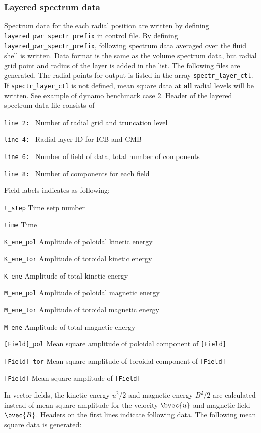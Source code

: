 \subsubsection{Layered spectrum data}
\label{section:layerd_spectr}
Spectrum data for the each radial position are written by defining {\tt layered\_pwr\_spectr\_prefix} in control file. By defining {\tt layered\_pwr\_spectr\_prefix}, following spectrum data averaged over the fluid shell is written. Data format is the same as the volume spectrum data, but radial grid point and radius of the layer is added in the list. The following files are generated. The radial points for output is listed in the array \verb|spectr_layer_ctl|. If \verb|spectr_layer_ctl| is not defined, mean square data at {\bf all} radial levels will be written. See example of \hyperref[section:dynamobench]{dynamo benchmark case 2}. Header of the layered spectrum data file consists of 
%
\begin{description}
\item{\tt  line 2: } Number of radial grid and truncation level
\item{\tt  line 4: } Radial layer ID for ICB and CMB
\item{\tt  line 6: } Number of field of data, total number of components
\item{\tt  line 8: } Number of components for each field
\end{description}
%
Field labels indicates as following:
%
\begin{description}
\item{\tt  t\_step}  Time setp number
\item{\tt  time}   Time
\item{\tt  K\_ene\_pol}  Amplitude of poloidal kinetic energy
\item{\tt  K\_ene\_tor}  Amplitude of toroidal kinetic energy
\item{\tt  K\_ene}       Amplitude of total kinetic energy
\item{\tt  M\_ene\_pol}  Amplitude of poloidal magnetic energy
\item{\tt  M\_ene\_tor}  Amplitude of toroidal magnetic energy
\item{\tt  M\_ene}       Amplitude of total magnetic energy
\item{\tt  [Field]\_pol} Mean square amplitude of poloidal component of {\tt [Field]}
\item{\tt  [Field]\_tor} Mean square amplitude of toroidal component of {\tt [Field]}
\item{\tt  [Field]}      Mean square amplitude of {\tt [Field]}
\end{description}
%
In vector fields, the kinetic energy $u^{2} / 2$ and magnetic energy $B^{2} / 2$ are calculated instead of mean square amplitude for the velocity $\bvec{u}$ and magnetic field $\bvec{B}$. Headers on the first lines indicate following data. The following mean square data is generated:

